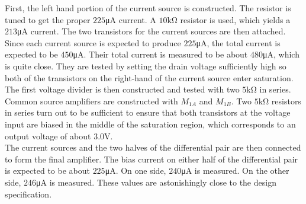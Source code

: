 First, the left hand portion of the current source is constructed.
The resistor is tuned to get the proper $225$\si{\micro\ampere} current.
A $10$\si{\kilo\ohm} resistor is used, which yields a $213$\si{\micro\ampere} current.
The two transistors for the current sources are then attached.
Since each current source is expected to produce $225$\si{\micro\ampere}, the total current is expected to be $450$\si{\micro\ampere}.
Their total current is measured to be about $480$\si{\micro\ampere}, which is quite close.
They are tested by setting the drain voltage sufficiently high so both of the transistors on the right-hand of the current source enter saturation. \\

The first voltage divider is then constructed and tested with two $5$\si{\kilo\ohm} in series.
Common source amplifiers are constructed with $M_{1A}$ and $M_{1B}$.
Two $5$\si{\kilo\ohm} resistors in series turn out to be sufficient to ensure that both transistors at the voltage input are biased in the middle of the saturation region, which corresponds to an output voltage of about $3.0$\si{\volt}. \\

The current sources and the two halves of the differential pair are then connected to form the final amplifier.
The bias current on either half of the differential pair is expected to be about $225$\si{\micro\ampere}.
On one side, $240$\si{\micro\ampere} is measured.
On the other side, $246$\si{\micro\ampere} is measured.
These values are astonishingly close to the design specification. \\
